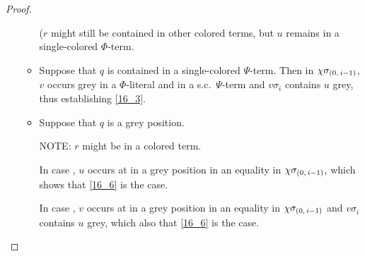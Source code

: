 \documentclass[,%
	draft=false,%
	numbers=noendperiod
	12pt,
	a4paper,
	oneside,%
	openany,
]{memoir}
\newcommand{\inv}{\ensuremath{\chi}}
\begin{document}
\begin{proof}
\begin{itemize}
\begin{itemize}
					($r$ might still be contained in other colored terms, but $u$ remains in a single-colored $\Phi$-term.

				\item Suppose that $q$ is contained in a single-colored $\Psi$-term.
					Then in $\inv\sigmazmi$, $v$ occurs grey in a $\Phi$-literal and in a s.c.\ $\Psi$-term and $v\sigma_i$ contains $u$ grey, thus establishing \ref{16_3}.


				\item Suppose that $q$ is a grey position.

					NOTE: $r$ might be in a colored term.

					In case , 
					$u$ occurs at in a grey position in an equality in $\inv\sigmazmi$, which shows that \ref{16_6} is the case.

					In case , 
					$v$ occurs at in a grey position in an equality in $\inv\sigmazmi$ and $v\sigma_i$ contains $u$ grey, which also that \ref{16_6} is the case.
					\qedhere



			\end{itemize}

	\end{itemize}

\end{proof}
\end{document}
